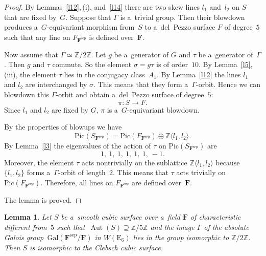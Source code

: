 \documentclass{amsart}
\numberwithin{equation}{section}
\theoremstyle{plain}
\newtheorem{lemma}{Lemma}
\theoremstyle{definition}
\theoremstyle{remark}
\begin{document}
\begin{proof}
By Lemmas~\ref{l12},\,(i), and~\ref{l14} there are two skew lines 
 $l_1$ and~$l_2$ on $S$
 that are fixed by~$G$. Suppose that $\Gamma$ is a~trivial group. Then their blowdown produces a~$G$-equivariant morphism from~$S$ to a~del~Pezzo surface $F$ of degree~$5$ such that any line on $F_{\mathbf{F}^{\mathrm{sep}}}$ is defined over~$\mathbf{F}$.

Now assume that $\Gamma \simeq \mathbb{Z}/2\mathbb{Z}$. Let $g$ be a~generator of $G$ and $\tau$ be a~generator of~$\Gamma$. Then $g$ and $\tau$ commute. So the element $\sigma=g\tau$ is of order~$10$. By Lemma~\ref{l5},\,(iii), the element $\tau$ lies in the conjugacy class~$A_1$. By Lemma~\ref{l12} the lines $l_1$ and $l_2$ are interchanged by $\sigma$. This means that they form a~$\Gamma$-orbit. Hence we can blowdown this $\Gamma$-orbit and obtain a~del~Pezzo surface of degree~$5$:
$$
\pi \colon S \to F.
$$
Since $l_1$ and $l_2$ are fixed by $G$, $\pi$ is a~$G$-equivariant blowdown.

By the properties of blowups we have
$$
\mathrm{Pic}(S_{\mathbf{F}^{\mathrm{sep}}})=\mathrm{Pic}(F_{\mathbf{F}^{\mathrm{sep}}}) \oplus \mathbb{Z}\langle l_1, l_2 \rangle.
$$
By Lemma~\ref{l3} the eigenvalues of the action of $\tau$ on $\mathrm{Pic}(S_{\mathbf{F}^{\mathrm{sep}}})$ are
$$
1,\ 1,\ 1,\ 1,\ 1,\ 1,\ -1.
$$
 Moreover, the element $\tau$ acts nontrivially on the sublattice $\mathbb{Z}\langle l_1, l_2 \rangle$ because $\{l_1, l_2\}$ forms a~$\Gamma$-orbit of length~$2$. This means that $\tau$ acts trivially on $\mathrm{Pic}(F_{\mathbf{F}^{\mathrm{sep}}})$. \mbox{Therefore}, all lines on $F_{\mathbf{F}^{\mathrm{sep}}}$ are defined over~$\mathbf{F}$.

The lemma is proved.
\end{proof}

\begin{lemma}
\label{l23}
Let $S$ be a~smooth cubic surface over a~field $\mathbf{F}$ of characteristic different from~$5$ such that~$\operatorname{Aut}(S) \supseteq \mathbb{Z}/5\mathbb{Z}$ and the image $\Gamma$ of the absolute Galois group~$\mathrm{Gal}(\mathbf{F}^{\mathrm{sep}}/\mathbf{F})$ in $W(\mathrm{E}_6)$ lies in the group isomorphic to $\mathbb{Z}/2\mathbb{Z}$. Then $S$ is isomorphic to the Clebsch cubic surface.
\end{lemma}
\end{document}
